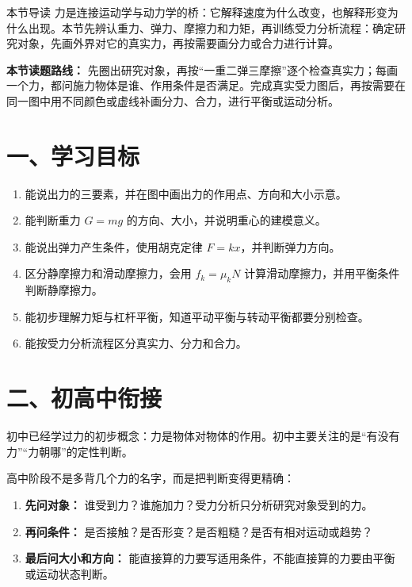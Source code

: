 
\begin{learningbox}{本节导读}
力是连接运动学与动力学的桥：它解释速度为什么改变，也解释形变为什么出现。本节先辨认重力、弹力、摩擦力和力矩，再训练受力分析流程：确定研究对象，先画外界对它的真实力，再按需要画分力或合力进行计算。
\end{learningbox}

\textbf{本节读题路线：} 先圈出研究对象，再按“一重二弹三摩擦”逐个检查真实力；每画一个力，都问施力物体是谁、作用条件是否满足。完成真实受力图后，再按需要在同一图中用不同颜色或虚线补画分力、合力，进行平衡或运动分析。

\section*{一、学习目标}

\begin{enumerate}
  \item 能说出力的三要素，并在图中画出力的作用点、方向和大小示意。
  \item 能判断重力 $G = mg$ 的方向、大小，并说明重心的建模意义。
  \item 能说出弹力产生条件，使用胡克定律 $F = kx$，并判断弹力方向。
  \item 区分静摩擦力和滑动摩擦力，会用 $f_k = \mu_k N$ 计算滑动摩擦力，并用平衡条件判断静摩擦力。
  \item 能初步理解力矩与杠杆平衡，知道平动平衡与转动平衡都要分别检查。
  \item 能按受力分析流程区分真实力、分力和合力。
\end{enumerate}

\section*{二、初高中衔接}

初中已经学过力的初步概念：力是物体对物体的作用。初中主要关注的是“有没有力”“力朝哪”的定性判断。

高中阶段不是多背几个力的名字，而是把判断变得更精确：
\begin{enumerate}
  \item \textbf{先问对象：} 谁受到力？谁施加力？受力分析只分析研究对象受到的力。
  \item \textbf{再问条件：} 是否接触？是否形变？是否粗糙？是否有相对运动或趋势？
  \item \textbf{最后问大小和方向：} 能直接算的力要写适用条件，不能直接算的力要由平衡或运动状态判断。
\end{enumerate}

